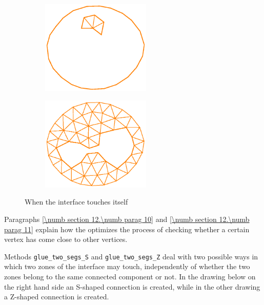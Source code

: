 \begin{figure}[ht] \centering
\begin{subfigure}{65mm}\centering
  \includegraphics[width=52mm]{touching-interf-1}
\end{subfigure}  
\begin{subfigure}{65mm}\centering
  \includegraphics[width=52mm]{touching-interf-2}
\end{subfigure}  
  \caption{When the interface touches itself}
  \label{\numb section 12.\numb fig 6}
\end{figure}

Paragraphs \ref{\numb section 12.\numb parag 10} and \ref{\numb section 12.\numb parag 11}
explain how the {\small\tt{}} optimizes the process of checking whether a
certain vertex has come close to other vertices.

Methods {\small\tt glue\_two\_segs\_S} and
{\small\tt glue\_two\_segs\_Z} deal with two possible ways in which two
zones of the interface may touch,
independently of whether the two zones belong to the same connected component or not.
In the drawing below on the right hand side an S-shaped connection is created,
while in the other drawing a Z-shaped connection is created.

